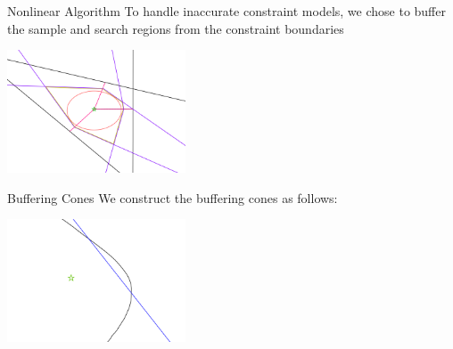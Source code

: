 \documentclass{beamer}
\begin{document}
% 	

% 


\begin{frame}{Nonlinear Algorithm}
	To handle inaccurate constraint models, 
	we chose to buffer the sample and search regions from the constraint boundaries
	
	\begin{center}
		\includegraphics[width=200px]{images/completed_2.png}
	\end{center}
	
\end{frame}

\begin{frame}{Buffering Cones}
	We construct the buffering cones as follows:
	\begin{center}
		\includegraphics[width=200px]{images/explanation_1.png}
	\end{center}
\end{frame}
\end{document}

